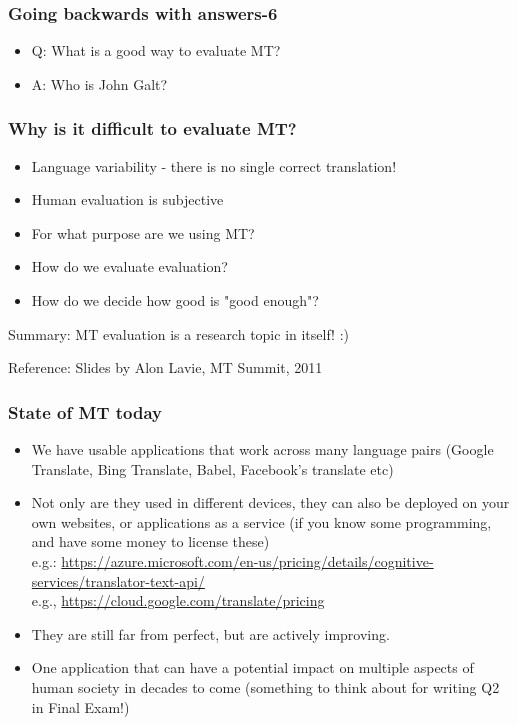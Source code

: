 \documentclass{beamer}
\begin{document}
\begin{frame}
\frametitle{Going backwards with answers-6}
\begin{itemize}
\item Q: What is a good way to evaluate MT?
\item A: Who is John Galt?
\end{itemize}
\end{frame}

\begin{frame}
\frametitle{Why is it difficult to evaluate MT?}
\begin{itemize}
\item Language variability - there is no single correct translation!
\item Human evaluation is subjective
\item For what purpose are we using MT?
\item How do we evaluate evaluation?
\item How do we decide how good is "good enough"?
\end{itemize}
Summary: MT evaluation is a research topic in itself! :)

Reference: Slides by Alon Lavie, MT Summit, 2011
\end{frame}

\begin{frame}
\frametitle{State of MT today}
\begin{itemize}
\item We have usable applications that work across many language pairs (Google Translate, Bing Translate, Babel, Facebook's translate etc)
\item Not only are they used in different devices, they can also be deployed on your own websites, or applications as a service (if you know some programming, and have some money to license these)
\\ e.g.: \url{https://azure.microsoft.com/en-us/pricing/details/cognitive-services/translator-text-api/}
\\ e.g., \url{https://cloud.google.com/translate/pricing}
\item They are still far from perfect, but are actively improving.
\item One application that can have a potential impact on multiple aspects of human society in decades to come (something to think about for writing Q2 in Final Exam!)
\end{itemize}
\end{frame}
\end{document}
